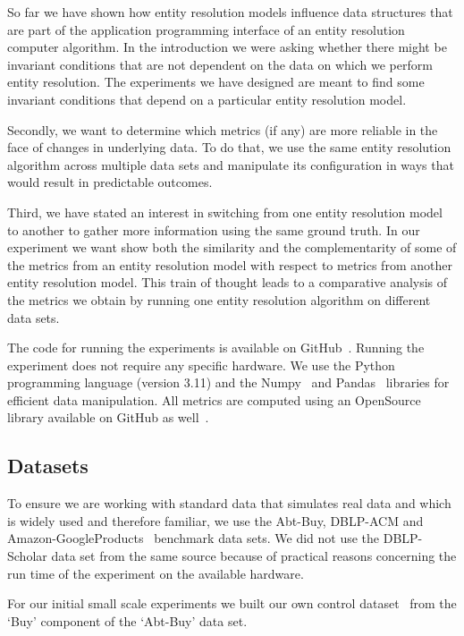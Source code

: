 So far we have shown how entity resolution models influence data structures
that are part of the application programming interface of an entity resolution
computer algorithm.
In the introduction we were asking whether there might be invariant conditions
that are not dependent on the data on which we perform entity resolution.
The experiments we have designed are meant to find some invariant conditions
that depend on a particular entity resolution model.

Secondly, we want to determine which metrics (if any) are more reliable in the
face of changes in underlying data.
To do that, we use the same entity resolution algorithm across multiple data
sets and manipulate its configuration in ways that would result in predictable
outcomes.

Third, we have stated an interest in switching from one entity resolution model
to another to gather more information using the same ground truth.
In our experiment we want show both the similarity and the complementarity of
some of the metrics from an entity resolution model with respect to metrics from
another entity resolution model.
This train of thought leads to a comparative analysis of the metrics we obtain
by running one entity resolution algorithm on different data sets.

The code for running the experiments is available on GitHub~\cite{matchescu}.
Running the experiment does not require any specific hardware.
We use the Python~\cite{python} programming language (version 3.11) and the
Numpy~\cite{numpy} and Pandas~\cite{pandas2023} libraries for efficient
data manipulation.
All metrics are computed using an OpenSource library available on GitHub as
well~\cite{matchescu-er-metrics2023}.

\subsection{Datasets}\label{subsec:data}


To ensure we are working with standard data that simulates real data and which
is widely used and therefore familiar, we use the Abt-Buy, DBLP-ACM and
Amazon-GoogleProducts~\cite{vldb2010} benchmark data sets.
We did not use the DBLP-Scholar data set from the same source because of
practical reasons concerning the run time of the experiment on the available
hardware.

For our initial small scale experiments we built our own control
dataset~\cite{expdata2023} from the `Buy' component of the `Abt-Buy' data set.

